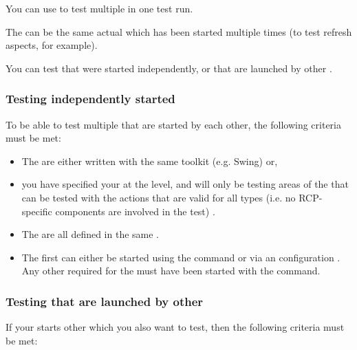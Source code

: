 You can use \app{} to test multiple \gdauts{} in one test run.

The \gdauts{} can be the same actual \gdaut{} which has been started multiple times (to test refresh aspects, for example). 

You can test \gdauts{} that were started independently, or \gdauts{} that are launched by other \gdauts{}.


\subsubsection{Testing independently started \gdauts{}}

To be able to test multiple \gdauts{} that are  started by each other, the following criteria must be met:

\begin{itemize}
\item The \gdauts{} are either written with the same toolkit (e.g. Swing) or,
\item you have specified your \gdproject{} at the  level, and will only be testing areas of the \gdauts{} that can be tested with the actions that are valid for all \gdaut{} types (i.e. no RCP-specific components are involved in the test) . 
\item The \gdauts{} are all defined in the same \gdproject{}.
\item The first \gdaut{} can either be started using the  command  or via an \gdaut{} configuration . Any other \gdauts{} required for the \gdjob{} must have been started with the  command.
\end{itemize}


\subsubsection{Testing \gdauts{} that are launched by other \gdauts{}}
\label{TasksLenientTest}

If your \gdaut{} starts other \gdauts{} which you also want to test, then the following criteria must be met:

